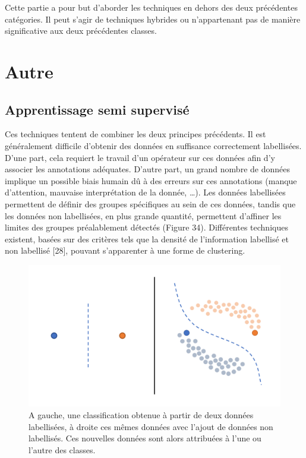 Cette partie a pour but d’aborder les techniques en dehors des deux précédentes catégories. Il peut s’agir de techniques hybrides ou n’appartenant pas de manière significative aux deux précédentes classes. 

\section{Autre}
\subsection{Apprentissage semi supervisé}
Ces techniques tentent de combiner les deux principes précédents. Il est généralement difficile d’obtenir des données en suffisance correctement labellisées. D’une part, cela requiert le travail d’un opérateur sur ces données afin d’y associer les annotations adéquates. D’autre part, un grand nombre de données implique un possible biais humain dû à des erreurs sur ces annotations (manque d’attention, mauvaise interprétation de la donnée, …).
Les données labellisées permettent de définir des groupes spécifiques au sein de ces données, tandis que les données non labellisées, en plus grande quantité, permettent d’affiner les limites des groupes préalablement détectés (Figure 34). Différentes techniques existent, basées sur des critères tels que la densité de l’information labellisé et non labellisé [28], pouvant s’apparenter à une forme de clustering.
 
\begin{figure}[H]
    \centering
    \includegraphics[width=\linewidth]{contents/chapter_3/resources/Semisupervised.pdf}
    \caption{A gauche, une classification obtenue à partir de deux données labellisées, à droite ces mêmes données avec l’ajout de données non labellisés. Ces nouvelles données sont alors attribuées à l’une ou l’autre des classes.}
    \label{fig:semisupervised}
\end{figure}

